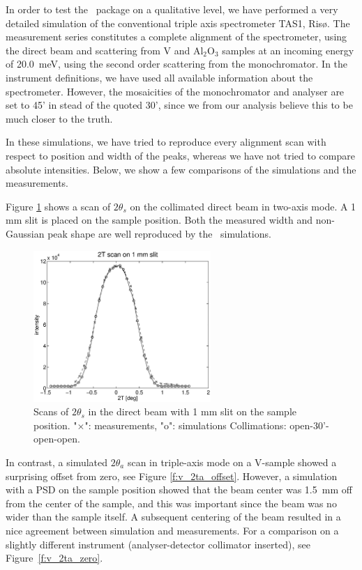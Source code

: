 In order to test the \MCS\ package on a qualitative level,
we have performed a very detailed simulation of the conventional
triple axis spectrometer TAS1, Ris\o . The measurement series
constitutes a complete alignment of the spectrometer,
using the direct beam and scattering from V and Al$_2$O$_3$
samples at an incoming energy of 20.0~meV, using the second order
scattering from the monochromator. 
In the instrument definitions, we have used all available
information about the spectrometer. However, the
mosaicities of the monochromator and analyser are set
to 45' in stead of the quoted 30', since we from our
analysis believe this to be much closer to the truth.

In these simulations, we have tried to reproduce
every alignment scan with respect to position and width
of the peaks, whereas we have not tried to compare
absolute intensities. Below, we show a few comparisons 
of the simulations and the measurements. 

Figure \ref{f:2t_direct} shows a scan of 
$2\theta_s$ on the collimated direct beam in two-axis mode.
A 1 mm slit is placed on the sample position.
Both the measured width and non-Gaussian peak shape
are well reproduced by the \MCS\ simulations.

\begin{figure}
  \begin{center}
    \includegraphics[width=0.6\textwidth]{figures/tas1-2T.eps}
  \end{center}
\caption{Scans of $2\theta_s$ in the direct beam with 1 mm slit on the
  sample position.
"$\times$": measurements, "o": simulations  
Collimations: open-30'-open-open.}
\label{f:2t_direct}
\end{figure}

In contrast, a simulated $2\theta_a$ scan in triple-axis 
mode on a V-sample showed a surprising offset from zero, see
Figure \ref{f:v_2ta_offset}. However, a simulation with a PSD
on the sample position showed that the beam center was 1.5~mm
off from the center of the sample, and this was important
since the beam was no wider than the sample itself.
A subsequent centering of the beam resulted in a nice
agreement between simulation and measurements. 
For a comparison on a slightly different instrument
(analyser-detector collimator inserted), 
see Figure~\ref{f:v_2ta_zero}.


